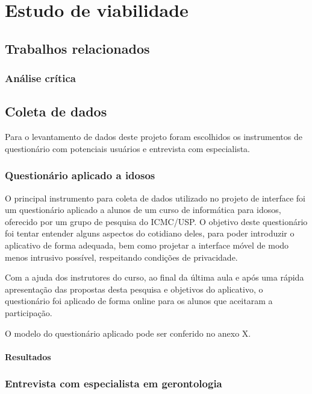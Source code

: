 \chapter{Estudo de viabilidade}

\section{Trabalhos relacionados}

\subsection{Análise crítica}

\section{Coleta de dados}

Para o levantamento de dados deste projeto foram escolhidos os instrumentos de questionário com potenciais usuários e entrevista com especialista.

\subsection{Questionário aplicado a idosos}

O principal instrumento para coleta de dados utilizado no projeto de interface foi um questionário aplicado a alunos de um curso de informática para idosos, oferecido por um grupo de pesquisa do ICMC/USP. O objetivo deste questionário foi tentar entender alguns aspectos do cotidiano deles, para poder introduzir o aplicativo de forma adequada, bem como projetar a interface móvel de modo menos intrusivo possível, respeitando condições de privacidade.

Com a ajuda dos instrutores do curso, ao final da última aula e após uma rápida apresentação das propostas desta pesquisa e objetivos do aplicativo, o questionário foi aplicado de forma online para os alunos que aceitaram a participação. 

O modelo do questionário aplicado pode ser conferido no anexo X.

\subsubsection{Resultados}

\subsection{Entrevista com especialista em gerontologia}

